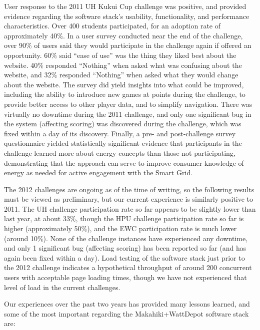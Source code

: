 User response to the 2011 UH Kukui Cup challenge was positive, and provided evidence regarding the software stack's usability, functionality, and performance characteristics.   Over 400 students participated, for an adoption rate of approximately 40\%.  In a user survey conducted near the end of the challenge, over 90\% of users said they would participate in the challenge again if offered an opportunity.  60\%  said ``ease of use'' was the thing they liked best about the website.  40\% responded ``Nothing'' when asked what was confusing about the website, and 32\% responded ``Nothing'' when asked what they would change about the website.  The survey did yield insights into what could be improved, including the ability to introduce new games at points during the challenge, to provide better access to other player data, and to simplify navigation.  There was virtually no downtime during the 2011 challenge, and only one significant bug in the system (affecting scoring) was discovered during the challenge, which was fixed within a day of its discovery.  Finally, a pre- and post-challenge survey questionnaire yielded statistically significant evidence that participants in the challenge learned more about energy concepts than those not participating, demonstrating that the approach can serve to improve consumer knowledge of energy as needed for active engagement with the Smart Grid.

The 2012 challenges are ongoing as of the time of writing, so the following results must be viewed as preliminary, but our current experience is similarly positive to 2011.  The UH challenge participation rate so far appears to be slightly lower than last year, at about 33\%, though the HPU challenge participation rate so far is higher (approximately 50\%), and the EWC participation rate is much lower (around 10\%). None of the challenge instances have experienced any downtime, and only 1 significant bug (affecting scoring) has been reported so far (and has again been fixed within a day).  Load testing of the software stack just prior to the 2012 challenge indicates a hypothetical throughput of around 200 concurrent users with acceptable page loading times, though we have not experienced that level of load in the current challenges.

Our experiences over the past two years has provided many lessons learned, and some of the most important regarding the Makahiki+WattDepot software stack are:

